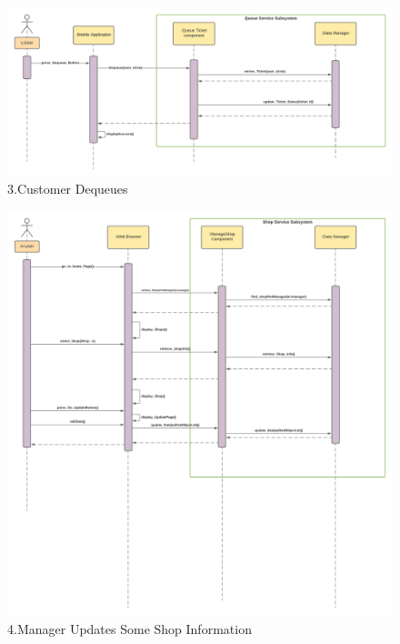 \begin{figure}[h!]
    \centering
    \includegraphics[width=1\textwidth]{Images/runtimeViewDD/RunTimeViewDequeue.png}
    \caption{\label{fig:RunTimeViewDequeue}{3.Customer Dequeues}}
\end{figure}

\begin{figure}[h!]
    \centering
    \includegraphics[width=1\textwidth]{Images/runtimeViewDD/updateshopruntime.png}
    \caption{\label{fig:RunTimeViewUpdateShopEnqueue}{4.Manager Updates Some Shop Information}}
\end{figure}

